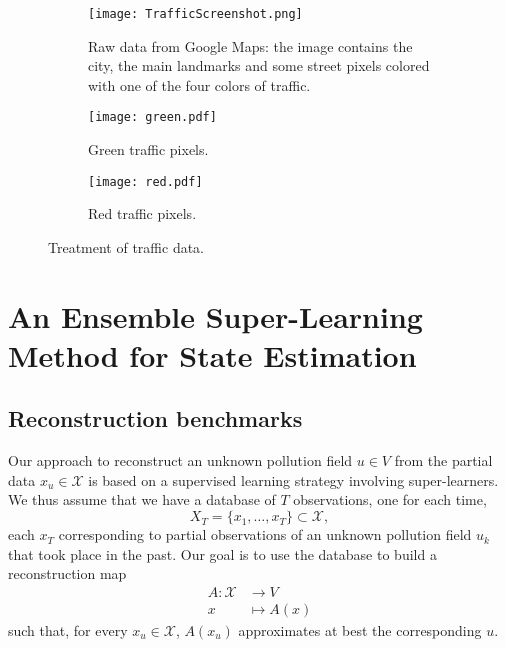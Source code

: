 \documentclass[11pt,a4paper,twoside]{article}
\theoremstyle{definition}
\numberwithin{equation}{section}
\newcommand{\cX}{\ensuremath{\mathcal{X}}}
\newcommand{\<}{\langle}
\renewcommand{\>}{\rangle}
\begin{document}
\begin{figure}
      \centering
      \begin{subfigure}[b]{0.6\textwidth}
          \centering
          \texttt{[image: TrafficScreenshot.png]}
          \caption{Raw data from Google Maps: the image contains the city, the main landmarks and some street pixels colored with one of the four colors of traffic.}
          \label{fig:traffic-raw-data}
      \end{subfigure}
      \hfill
      \begin{subfigure}[b]{0.45\textwidth}
          \centering
          \texttt{[image: green.pdf]}
          \caption{Green traffic pixels. }
          \label{fig:green-traffic}
      \end{subfigure}
      \begin{subfigure}[b]{0.45\textwidth}
          \centering
          \texttt{[image: red.pdf]}
          \caption{Red traffic pixels. }
          \label{fig:red-traffic}
      \end{subfigure}
      \caption{Treatment of traffic data.}
      \label{fig:traffic-preprocess}
 \end{figure}
 



\section{An Ensemble Super-Learning Method for State Estimation}
\label{sec:rigorous}

\subsection{Reconstruction benchmarks}
Our approach to reconstruct an unknown pollution field $u\in V$ from the partial data $x_u\in \cX$ is based on a supervised learning strategy involving super-learners. We thus assume that we have a database of $T$ observations, one for each time,
$$
X_T = \{x_1,\dots, x_T\} \subset \cX,
$$
each $x_T$ corresponding to partial observations of an unknown pollution field $u_k$ that took place in the past. Our goal is to use the database to build a reconstruction map
\begin{align*}
A: \cX &\to V \\
x &\mapsto A(x)
\end{align*}
such that, for every $x_u\in \cX$, $A(x_u)$ approximates at best the corresponding $u$.
\end{document}
